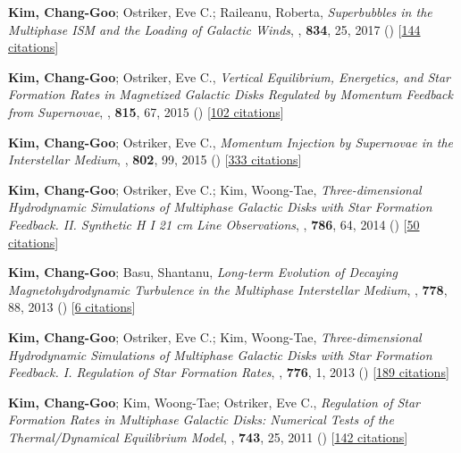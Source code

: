 \item[{45.}]\textbf{Kim, Chang-Goo}; Ostriker, Eve C.; Raileanu, Roberta, \textit{Superbubbles in the Multiphase ISM and the Loading of Galactic Winds}, , \textbf{834}, 25, 2017 () [\href{http://adsabs.harvard.edu/abs/2017ApJ...834...25K}{144 citations}]

\item[{44.}]\textbf{Kim, Chang-Goo}; Ostriker, Eve C., \textit{Vertical Equilibrium, Energetics, and Star Formation Rates in Magnetized Galactic Disks Regulated by Momentum Feedback from Supernovae}, , \textbf{815}, 67, 2015 () [\href{http://adsabs.harvard.edu/abs/2015ApJ...815...67K}{102 citations}]

\item[{43.}]\textbf{Kim, Chang-Goo}; Ostriker, Eve C., \textit{Momentum Injection by Supernovae in the Interstellar Medium}, , \textbf{802}, 99, 2015 () [\href{http://adsabs.harvard.edu/abs/2015ApJ...802...99K}{333 citations}]

\item[{42.}]\textbf{Kim, Chang-Goo}; Ostriker, Eve C.; Kim, Woong-Tae, \textit{Three-dimensional Hydrodynamic Simulations of Multiphase Galactic Disks with Star Formation Feedback. II. Synthetic H I 21 cm Line Observations}, , \textbf{786}, 64, 2014 () [\href{http://adsabs.harvard.edu/abs/2014ApJ...786...64K}{50 citations}]

\item[{41.}]\textbf{Kim, Chang-Goo}; Basu, Shantanu, \textit{Long-term Evolution of Decaying Magnetohydrodynamic Turbulence in the Multiphase Interstellar Medium}, , \textbf{778}, 88, 2013 () [\href{http://adsabs.harvard.edu/abs/2013ApJ...778...88K}{6 citations}]

\item[{40.}]\textbf{Kim, Chang-Goo}; Ostriker, Eve C.; Kim, Woong-Tae, \textit{Three-dimensional Hydrodynamic Simulations of Multiphase Galactic Disks with Star Formation Feedback. I. Regulation of Star Formation Rates}, , \textbf{776}, 1, 2013 () [\href{http://adsabs.harvard.edu/abs/2013ApJ...776....1K}{189 citations}]

\item[{39.}]\textbf{Kim, Chang-Goo}; Kim, Woong-Tae; Ostriker, Eve C., \textit{Regulation of Star Formation Rates in Multiphase Galactic Disks: Numerical Tests of the Thermal/Dynamical Equilibrium Model}, , \textbf{743}, 25, 2011 () [\href{http://adsabs.harvard.edu/abs/2011ApJ...743...25K}{142 citations}]

